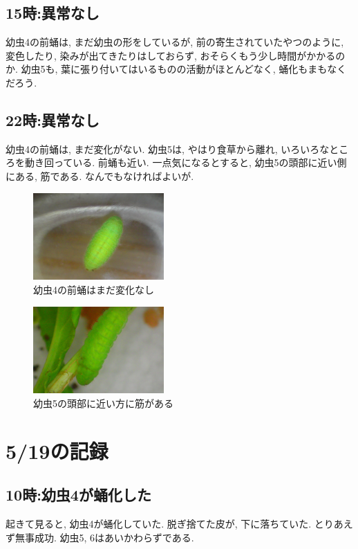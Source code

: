 \documentclass{jsarticle}
\begin{document}
\subsection{15時:異常なし}
幼虫4の前蛹は, まだ幼虫の形をしているが, 前の寄生されていたやつのように, 変色したり, 染みが出てきたりはしておらず, おそらくもう少し時間がかかるのか. 
幼虫5も, 葉に張り付いてはいるものの活動がほとんどなく, 蛹化もまもなくだろう. 

\subsection{22時:異常なし}
幼虫4の前蛹は, まだ変化がない. 幼虫5は, やはり食草から離れ, いろいろなところを動き回っている. 前蛹も近い. 
一点気になるとすると, 幼虫5の頭部に近い側にある, 筋である. なんでもなければよいが. 

\begin{figure}[htbp]
  \begin{center}
    \includegraphics[width=5cm]{photo5/Larva4-prePupa.JPG}
  \end{center}
  \caption{幼虫4の前蛹はまだ変化なし}
\end{figure}

\begin{figure}[htbp]
  \begin{center}
    \includegraphics[width=5cm]{photo5/Larva5.JPG}
  \end{center}
  \caption{幼虫5の頭部に近い方に筋がある}
\end{figure}

\section{5/19の記録}
\subsection{10時:幼虫4が蛹化した}
起きて見ると, 幼虫4が蛹化していた. 脱ぎ捨てた皮が, 下に落ちていた. とりあえず無事成功. 
幼虫5, 6はあいかわらずである. 
\end{document}

